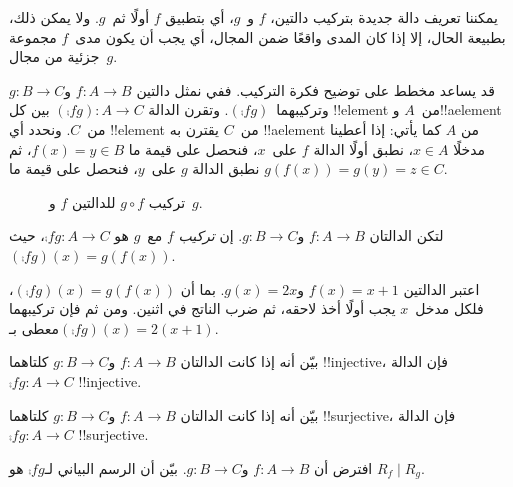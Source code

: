 \documentclass[../../../include/open-logic-section]{subfiles}
\begin{document}

\begin{explain}
يمكننا تعريف دالة جديدة
بتركيب دالتين، $f$ و~$g$، أي بتطبيق $f$ أولًا ثم~$g$. ولا يمكن
ذلك، بطبيعة الحال، إلا إذا كان المدى واقعًا ضمن المجال، أي يجب أن يكون
مدى~$f$ مجموعة جزئية من مجال~$g$. 

قد يساعد مخطط على توضيح فكرة التركيب. ففي
 نمثل دالتين $f \colon A \to B$
و$g \colon B \to C$ وتركيبهما~$(\comp{f}{g})$. وتقرن
الدالة $(\comp{f}{g}) \colon A \to C$ بين كل !!{element} من~$A$
و!!a{element} من~$C$. ونحدد أي !!{element} من~$C$
يقترن به !!a{element} من $A$ كما يأتي: إذا أعطينا مدخلًا $x \in
A$، نطبق أولًا الدالة $f$ على~$x$، فنحصل على قيمة ما $f(x)
= y \in B$، ثم نطبق الدالة $g$ على~$y$، فنحصل على قيمة ما
$g(f(x)) = g(y) = z \in C$.
\begin{figure}
  \caption{تركيب $g \circ f$ للدالتين $f$ و~$g$.}
\end{figure}
\end{explain}

\begin{defn}[التركيب]
لتكن الدالتان $f\colon A \to B$ و$g\colon B \to C$. إن
\emph{تركيب} $f$ مع~$g$ هو $\comp{f}{g} \colon A \to C$،
حيث $(\comp{f}{g})(x) = g(f(x))$.
\end{defn}

\begin{ex}
اعتبر الدالتين $f(x) = x + 1$ و$g(x) = 2x$. بما أن
$(\comp{f}{g})(x) = g(f(x))$، فلكل مدخل~$x$ يجب أولًا أخذ لاحقه،
ثم ضرب الناتج في اثنين. ومن ثم فإن تركيبهما
معطى بـ$(\comp{f}{g})(x) = 2(x+1)$.
\end{ex}

\begin{prob}
بيّن أنه إذا كانت الدالتان $f \colon A \to B$ و$g \colon B \to C$
كلتاهما !!{injective}، فإن الدالة $\comp{f}{g}\colon A \to C$
!!{injective}.
\end{prob}

\begin{prob}
بيّن أنه إذا كانت الدالتان $f \colon A \to B$ و$g \colon B \to C$
كلتاهما !!{surjective}، فإن الدالة $\comp{f}{g}\colon A \to C$
!!{surjective}.
\end{prob}

\begin{prob}
افترض أن $f \colon A \to B$ و$g \colon B \to C$. بيّن أن الرسم
البياني لـ$\comp{f}{g}$ هو $R_f \mid R_g$.
\end{prob}
\end{document}
